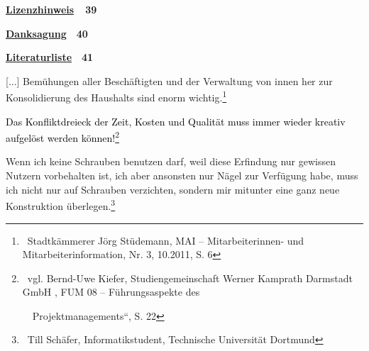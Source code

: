 \documentclass[a4paper]{article}
\newcommand\textstyleInternetlink[1]{\foreignlanguage{english}{\textcolor[rgb]{0.0,0.0,0.5019608}{#1}}}
\begin{document}
\bigskip

{
\hyperlink{Lizenzhinweis}{\textstyleInternetlink{\textbf{Lizenzhinweis}}}\textbf{\ \ 39}}


\bigskip


\bigskip

{
\hyperlink{Danksagung}{\textstyleInternetlink{\textbf{Danksagung}}}\ \ \textbf{40}}


\bigskip


\bigskip

{
\hyperlink{Literaturliste}{\textstyleInternetlink{\foreignlanguage{ngerman}{\textbf{Literaturliste}}}}\ \ \textbf{41}}



\bigskip


\bigskip

{
{\guillemotright} [...] Bem\"uhungen aller Besch\"aftigten und der
Verwaltung von innen her zur Konsolidierung des Haushalts sind enorm
wichtig.{\guillemotleft}\footnote{\ Stadtk\"ammerer J\"org St\"udemann,
MAI -- Mitarbeiterinnen- und Mitarbeiterinformation, Nr. 3, 10.2011, S.
6}}


\bigskip


\bigskip

{
\textcolor{black}{Das Konfliktdreieck der Zeit, Kosten und Qualit\"at
muss immer wieder kreativ aufgel\"ost werden k\"onnen!}\footnote{\ vgl.
Bernd-Uwe Kiefer, Studiengemeinschaft Werner Kamprath Darmstadt GmbH ,
{\quotedblbase}FUM 08 -- F\"uhrungsaspekte des\par
\ \ Projektmanagements{\textquotedblleft}, S. 22}}


\bigskip


\bigskip

{
{\guillemotright}Wenn ich keine Schrauben benutzen darf, weil diese
Erfindung nur gewissen Nutzern vorbehalten ist, ich aber ansonsten nur
N\"agel zur Verf\"ugung habe, muss ich nicht nur auf Schrauben
verzichten, sondern mir mitunter eine ganz neue Konstruktion
\"uberlegen.{\guillemotleft}\footnote{\ Till Sch\"afer,
Informatikstudent, Technische Universit\"at Dortmund}}

\end{document}
